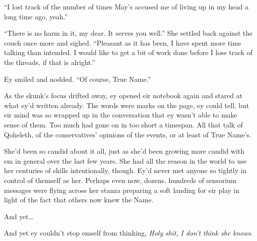 ``I lost track of the number of times May's accused me of living up in my head a long time ago, yeah.''

``There is no harm in it, my dear. It serves you well.'' She settled back against the couch once more and sighed. ``Pleasant as it has been, I have spent more time talking than intended. I would like to get a bit of work done before I lose track of the threads, if that is alright.''

Ey smiled and nodded. ``Of course, True Name.''

As the skunk's focus drifted away, ey opened eir notebook again and stared at what ey'd written already. The words were marks on the page, ey could tell, but eir mind was so wrapped up in the conversation that ey wasn't able to make sense of them. Too much had gone on in too short a timespan. All that talk of Qoheleth, of the conservatives' opinions of the events, or at least of True Name's.

She'd been so candid about it all, just as she'd been growing more candid with em in general over the last few years. She had all the reason in the world to use her centuries of skills intentionally, though. Ey'd never met anyone so tightly in control of themself as her. Perhaps even now, dozens, hundreds of sensorium messages were flying across her stanza preparing a soft landing for eir play in light of the fact that others now knew the Name.

And yet\ldots{}

And yet ey couldn't stop emself from thinking, \emph{Holy shit, I don't think she knows.}
